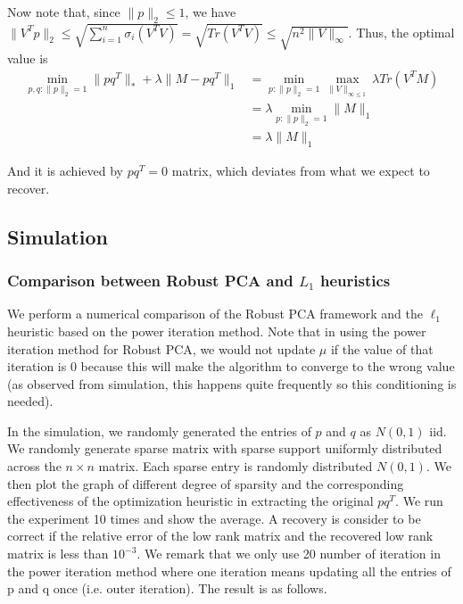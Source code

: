 Now note that, since $\|p\|_{2}\le1$, we have $\|V^{T}p\|_{2}\le\sqrt{\sum_{i=1}^{n}\sigma_{i}(V^{T}V)}=\sqrt{Tr(V^{T}V)}\le\sqrt{n^{2}\|V\|_{\infty}}$.
Thus, the optimal value is
\begin{align*}
\min_{p,q:\|p\|_{2}=1}\|pq^{T}\|_{*}+\lambda\|M-pq^{T}\|_{1}
& = \min_{p:\|p\|_{2}=1}\max_{\|V\|_{\infty\le1}}\lambda Tr(V^{T}M)\\
& = \lambda \min_{p:\|p\|_{2}=1}\|M\|_{1}\\
& = \lambda \|M\|_{1}
\end{align*}


And it is achieved by $pq^{T}=0$ matrix, which deviates from what
we expect to recover.


\subsection{Simulation }


\subsubsection{Comparison between Robust PCA and $L_{1}$ heuristics}

We perform a numerical comparison of the Robust PCA framework and the $\ell_{1}$ heuristic based on the power iteration method. Note that in using the power iteration method for Robust PCA, we would not update $\mu$ if the value of that iteration is 0 because this will make the algorithm to converge to the wrong value (as observed from simulation, this happens quite frequently so this conditioning is needed).

In the simulation, we randomly generated the entries of $p$ and $q$ as $N(0,1)$ iid. We randomly generate sparse matrix with sparse support uniformly distributed across the $n \times n$ matrix. Each sparse entry is randomly distributed $N(0,1)$. We then plot the graph of different degree of sparsity and the corresponding effectiveness of the optimization heuristic in extracting the original $pq^{T}$. We run the experiment 10 times and show the average. A recovery is consider to be correct if the relative error of the low rank matrix and the recovered low rank matrix is less than $10^{-3}$. We remark that we only use 20 number of iteration in the power iteration method where one iteration means updating all the entries of p and q once (i.e. outer iteration). The result is as follows.

